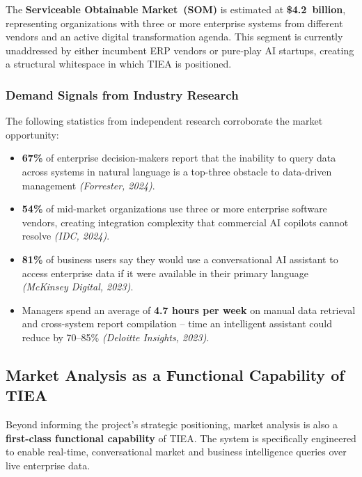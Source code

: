 \documentclass[12pt,a4paper]{report}
\begin{document}
The \textbf{Serviceable Obtainable Market~(SOM)} is estimated at \textbf{\$4.2~billion},
representing organizations with three or more enterprise systems from different vendors and an
active digital transformation agenda.
This segment is currently unaddressed by either incumbent ERP vendors or pure-play AI startups,
creating a structural whitespace in which TIEA is positioned.

\subsubsection{Demand Signals from Industry Research}

The following statistics from independent research corroborate the market opportunity:

\begin{itemize}
  \item \textbf{67\%} of enterprise decision-makers report that the inability to query data across
    systems in natural language is a top-three obstacle to data-driven management
    \emph{(Forrester, 2024)}.
  \item \textbf{54\%} of mid-market organizations use three or more enterprise software vendors,
    creating integration complexity that commercial AI copilots cannot resolve
    \emph{(IDC, 2024)}.
  \item \textbf{81\%} of business users say they would use a conversational AI assistant to access
    enterprise data if it were available in their primary language
    \emph{(McKinsey Digital, 2023)}.
  \item Managers spend an average of \textbf{4.7 hours per week} on manual data retrieval and
    cross-system report compilation -- time an intelligent assistant could reduce by
    70--85\% \emph{(Deloitte Insights, 2023)}.
\end{itemize}

\subsection{Market Analysis as a Functional Capability of TIEA}

Beyond informing the project's strategic positioning, market analysis is also a
\textbf{first-class functional capability} of TIEA.
The system is specifically engineered to enable real-time, conversational market and business
intelligence queries over live enterprise data.
\end{document}
